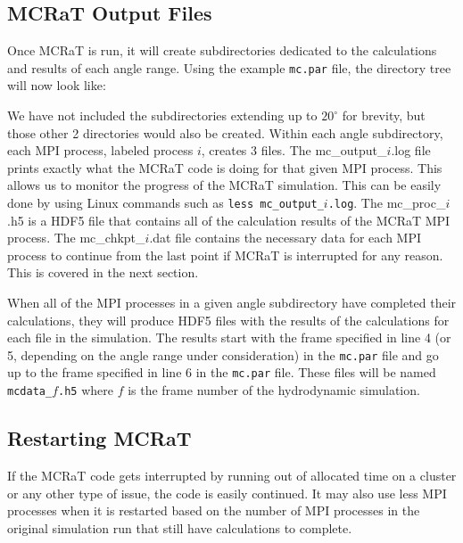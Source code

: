 \documentclass[12pt,a4paper]{article}
\begin{document}
 \subsection{MCRaT Output Files}
 Once MCRaT is run, it will create subdirectories dedicated to the calculations and results of each angle range. Using the example \texttt{mc.par} file, the directory tree will now look like: 
 
 \begin{figure}[h!]
 \end{figure}
 
 We have not included the subdirectories extending up to $20^\circ$ for brevity, but those other 2 directories would also be created. Within each angle subdirectory, each MPI process, labeled process $i$, creates 3 files. The mc\_output\_$i$.log file prints exactly what the MCRaT code is doing for that given MPI process. This allows us to monitor the progress of the MCRaT simulation. This can be easily done by using Linux commands such as \texttt{less mc\_output\_$i$.log}. The mc\_proc\_$i$.h5 is a HDF5 file that contains all of the calculation results of the MCRaT MPI process. The mc\_chkpt\_$i$.dat file contains the necessary data for each MPI process to continue from the last point if MCRaT is interrupted for any reason. This is covered in the next section.
 
 When all of the MPI processes in a given angle subdirectory have completed their calculations, they will produce HDF5 files with the results of the calculations for each file in the simulation. The results start with the frame specified in line 4 (or 5, depending on the angle range under consideration) in the \texttt{mc.par} file and go up to the frame specified in line 6 in the \texttt{mc.par} file. These files will be named \texttt{mcdata\_$f$.h5} where $f$ is the frame number of the hydrodynamic simulation.
 
 \subsection{Restarting MCRaT}
 If the MCRaT code gets interrupted by running out of allocated time on a cluster or any other type of issue, the code is easily continued. It may also use less MPI processes when it is restarted based on the number of MPI processes in the original simulation run that still have calculations to complete. 
 
\end{document}
